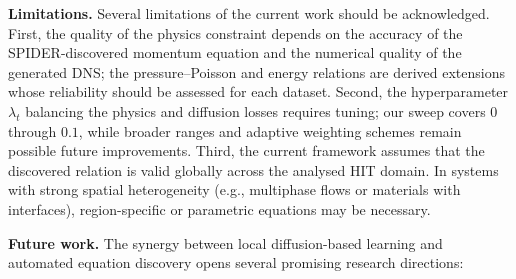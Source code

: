 \documentclass[preprint,12pt]{elsarticle}
\begin{document}
\textbf{Limitations.} Several limitations of the current work should be acknowledged. First, the quality of the physics constraint depends on the accuracy of the SPIDER-discovered momentum equation and the numerical quality of the generated DNS; the pressure--Poisson and energy relations are derived extensions whose reliability should be assessed for each dataset. Second, the hyperparameter $\lambda_t$ balancing the physics and diffusion losses requires tuning; our sweep covers $0$ through $0.1$, while broader ranges and adaptive weighting schemes remain possible future improvements. Third, the current framework assumes that the discovered relation is valid globally across the analysed HIT domain. In systems with strong spatial heterogeneity (e.g., multiphase flows or materials with interfaces), region-specific or parametric equations may be necessary.

\textbf{Future work.} The synergy between local diffusion-based learning and automated equation discovery opens several promising research directions:
\end{document}

